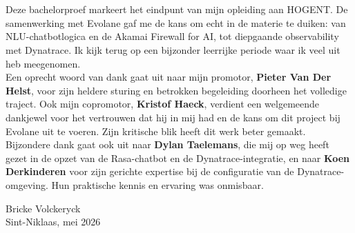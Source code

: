
\chapter*{}%
\label{ch:voorwoord}

Deze bachelorproef markeert het eindpunt van mijn opleiding aan HOGENT. De samenwerking met Evolane gaf me de kans om echt in de materie te duiken: van NLU-chatbotlogica en de Akamai Firewall for AI, tot diepgaande observability met Dynatrace. Ik kijk terug op een bijzonder leerrijke periode waar ik veel uit heb meegenomen. \\

Een oprecht woord van dank gaat uit naar mijn promotor, \textbf{Pieter Van Der Helst}, voor zijn heldere sturing en betrokken begeleiding doorheen het volledige traject. Ook mijn copromotor, \textbf{Kristof Haeck}, verdient een welgemeende dankjewel voor het vertrouwen dat hij in mij had en de kans om dit project bij Evolane uit te voeren. Zijn kritische blik heeft dit werk beter gemaakt.\\

Bijzondere dank gaat ook uit naar \textbf{Dylan Taelemans}, die mij op weg heeft gezet in de opzet van de Rasa-chatbot en de Dynatrace-integratie, en naar \textbf{Koen Derkinderen} voor zijn gerichte expertise bij de configuratie van de Dynatrace-omgeving. Hun praktische kennis en ervaring was onmisbaar.
\vspace{2cm}

\begin{flushright}
    Bricke Volckeryck \\
    Sint-Niklaas, mei 2026
\end{flushright}